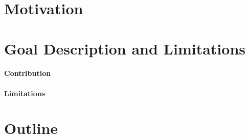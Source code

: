 \section{Motivation}
\blindtext

\section{Goal Description and Limitations}
\blindtext

\paragraph{Contribution}
\blindtext

\paragraph{Limitations}
\blindtext

\section{Outline}
\blindtext


